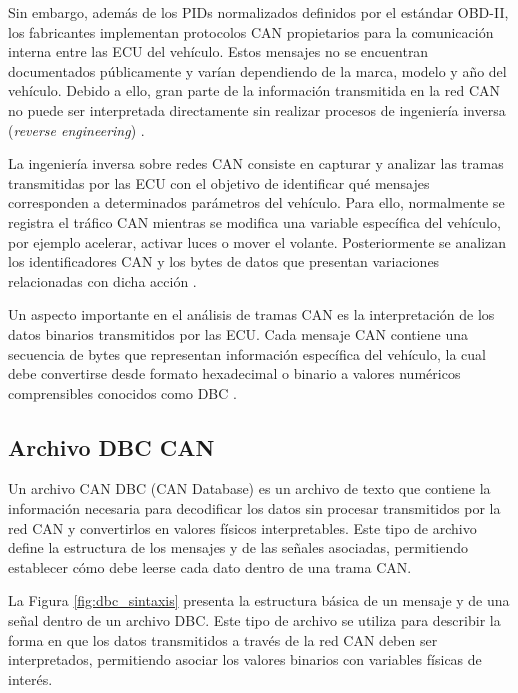 Sin embargo, además de los PIDs normalizados definidos por el estándar OBD-II, los fabricantes implementan protocolos CAN propietarios para la comunicación interna entre las ECU del vehículo. Estos mensajes no se encuentran documentados públicamente y varían dependiendo de la marca, modelo y año del vehículo. Debido a ello, gran parte de la información transmitida en la red CAN no puede ser interpretada directamente sin realizar procesos de ingeniería inversa (\textit{reverse engineering}) \citep{Flexihub_OBD2, CAN_D_2020}.

La ingeniería inversa sobre redes CAN consiste en capturar y analizar las tramas transmitidas por las ECU con el objetivo de identificar qué mensajes corresponden a determinados parámetros del vehículo. Para ello, normalmente se registra el tráfico CAN mientras se modifica una variable específica del vehículo, por ejemplo acelerar, activar luces o mover el volante. Posteriormente se analizan los identificadores CAN y los bytes de datos que presentan variaciones relacionadas con dicha acción \citep{reddit_CAN_reverse, embedded_CAN_reverse}. 

Un aspecto importante en el análisis de tramas CAN es la interpretación de los datos binarios transmitidos por las ECU. Cada mensaje CAN contiene una secuencia de bytes que representan información específica del vehículo, la cual debe convertirse desde formato hexadecimal o binario a valores numéricos comprensibles conocidos como DBC \citep{Flexihub_OBD2}. 

\subsection{Archivo DBC CAN}

Un archivo CAN DBC (CAN Database) es un archivo de texto que contiene la información necesaria para decodificar los datos sin procesar transmitidos por la red CAN y convertirlos en valores físicos interpretables. Este tipo de archivo define la estructura de los mensajes y de las señales asociadas, permitiendo establecer cómo debe leerse cada dato dentro de una trama CAN.

La Figura \ref{fig:dbc_sintaxis} presenta la estructura básica de un mensaje y de una señal dentro de un archivo DBC. Este tipo de archivo se utiliza para describir la forma en que los datos transmitidos a través de la red CAN deben ser interpretados, permitiendo asociar los valores binarios con variables físicas de interés.

